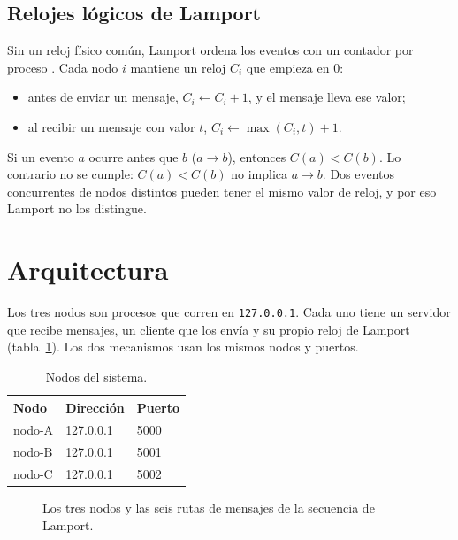\documentclass[11pt,a4paper]{article}
\begin{document}
\subsection{Relojes lógicos de Lamport}

Sin un reloj físico común, Lamport ordena los eventos con un contador por proceso
\cite{lamport1978}. Cada nodo $i$ mantiene un reloj $C_i$ que empieza en 0:
\begin{itemize}
  \item antes de enviar un mensaje, $C_i \leftarrow C_i + 1$, y el mensaje lleva ese valor;
  \item al recibir un mensaje con valor $t$, $C_i \leftarrow \max(C_i, t) + 1$.
\end{itemize}
Si un evento $a$ ocurre antes que $b$ ($a \rightarrow b$), entonces $C(a) < C(b)$. Lo
contrario no se cumple: $C(a) < C(b)$ no implica $a \rightarrow b$. Dos eventos
concurrentes de nodos distintos pueden tener el mismo valor de reloj, y por eso Lamport
no los distingue.

\section{Arquitectura}

Los tres nodos son procesos que corren en \texttt{127.0.0.1}. Cada uno tiene un servidor
que recibe mensajes, un cliente que los envía y su propio reloj de Lamport
(tabla~\ref{tab:nodos}). Los dos mecanismos usan los mismos nodos y puertos.

\begin{table}[htbp]
  \centering
  \caption{Nodos del sistema.}
  \label{tab:nodos}
  \begin{tabular}{lll}
    \toprule
    Nodo & Dirección & Puerto \\
    \midrule
    nodo-A & 127.0.0.1 & 5000 \\
    nodo-B & 127.0.0.1 & 5001 \\
    nodo-C & 127.0.0.1 & 5002 \\
    \bottomrule
  \end{tabular}
\end{table}

\begin{figure}[htbp]
  \centering
  \caption{Los tres nodos y las seis rutas de mensajes de la secuencia de Lamport.}
  \label{fig:nodos}
\end{figure}
\end{document}
